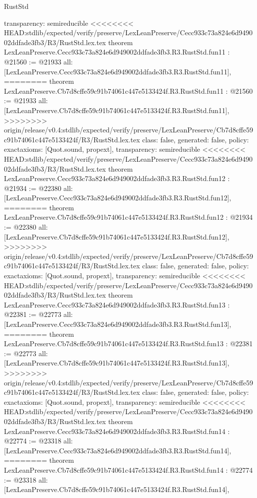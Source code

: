 \begin{lexlean}{RustStd}
\begin{coremodule}
{\begin{coremodule}
{{{{{{{{{{{{{{  transparency: semireducible
}
<<<<<<<< HEAD:stdlib/expected/verify/preserve/LexLeanPreserve/Cecc933c73a824e6d949002ddfade3fb3/R3/RustStd.lex.tex
theorem LexLeanPreserve.Cecc933c73a824e6d949002ddfade3fb3.R3.RustStd.fun11 : @21560 := @21933 {
  all: [LexLeanPreserve.Cecc933c73a824e6d949002ddfade3fb3.R3.RustStd.fun11],
========
theorem LexLeanPreserve.Cb7d8cffe59c91b74061c447e5133424f.R3.RustStd.fun11 : @21560 := @21933 {
  all: [LexLeanPreserve.Cb7d8cffe59c91b74061c447e5133424f.R3.RustStd.fun11],
>>>>>>>> origin/release/v0.4:stdlib/expected/verify/preserve/LexLeanPreserve/Cb7d8cffe59c91b74061c447e5133424f/R3/RustStd.lex.tex
  class: false,
  generated: false,
  policy: exact{axioms: [Quot.sound, propext]},
  transparency: semireducible
}
<<<<<<<< HEAD:stdlib/expected/verify/preserve/LexLeanPreserve/Cecc933c73a824e6d949002ddfade3fb3/R3/RustStd.lex.tex
theorem LexLeanPreserve.Cecc933c73a824e6d949002ddfade3fb3.R3.RustStd.fun12 : @21934 := @22380 {
  all: [LexLeanPreserve.Cecc933c73a824e6d949002ddfade3fb3.R3.RustStd.fun12],
========
theorem LexLeanPreserve.Cb7d8cffe59c91b74061c447e5133424f.R3.RustStd.fun12 : @21934 := @22380 {
  all: [LexLeanPreserve.Cb7d8cffe59c91b74061c447e5133424f.R3.RustStd.fun12],
>>>>>>>> origin/release/v0.4:stdlib/expected/verify/preserve/LexLeanPreserve/Cb7d8cffe59c91b74061c447e5133424f/R3/RustStd.lex.tex
  class: false,
  generated: false,
  policy: exact{axioms: [Quot.sound, propext]},
  transparency: semireducible
}
<<<<<<<< HEAD:stdlib/expected/verify/preserve/LexLeanPreserve/Cecc933c73a824e6d949002ddfade3fb3/R3/RustStd.lex.tex
theorem LexLeanPreserve.Cecc933c73a824e6d949002ddfade3fb3.R3.RustStd.fun13 : @22381 := @22773 {
  all: [LexLeanPreserve.Cecc933c73a824e6d949002ddfade3fb3.R3.RustStd.fun13],
========
theorem LexLeanPreserve.Cb7d8cffe59c91b74061c447e5133424f.R3.RustStd.fun13 : @22381 := @22773 {
  all: [LexLeanPreserve.Cb7d8cffe59c91b74061c447e5133424f.R3.RustStd.fun13],
>>>>>>>> origin/release/v0.4:stdlib/expected/verify/preserve/LexLeanPreserve/Cb7d8cffe59c91b74061c447e5133424f/R3/RustStd.lex.tex
  class: false,
  generated: false,
  policy: exact{axioms: [Quot.sound, propext]},
  transparency: semireducible
}
<<<<<<<< HEAD:stdlib/expected/verify/preserve/LexLeanPreserve/Cecc933c73a824e6d949002ddfade3fb3/R3/RustStd.lex.tex
theorem LexLeanPreserve.Cecc933c73a824e6d949002ddfade3fb3.R3.RustStd.fun14 : @22774 := @23318 {
  all: [LexLeanPreserve.Cecc933c73a824e6d949002ddfade3fb3.R3.RustStd.fun14],
========
theorem LexLeanPreserve.Cb7d8cffe59c91b74061c447e5133424f.R3.RustStd.fun14 : @22774 := @23318 {
  all: [LexLeanPreserve.Cb7d8cffe59c91b74061c447e5133424f.R3.RustStd.fun14],
}}}}}}}}}}}}}}}}}}
\end{coremodule}}
\end{coremodule}
\end{lexlean}
